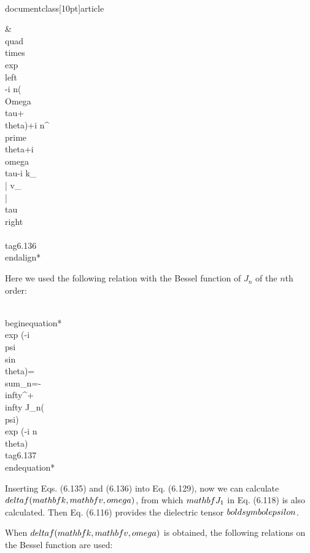 \\documentclass[10pt]{article}
\begin{document}
{{{{& \\quad \\times \\exp \\left\\{-i n(\\Omega \\tau+\\theta)+i n^{\\prime} \\theta+i \\omega \\tau-i k_{\\|} v_{\\|} \\tau\\right\\} \\tag{6.136}
\\end{align*}


Here we used the following relation with the Bessel function of $J_{n}$ of the $n$th order:


\\begin{equation*}
\\exp (-i \\psi \\sin \\theta)=\\sum_{n=-\\infty}^{+\\infty} J_{n}(\\psi) \\exp (-i n \\theta) \\tag{6.137}
\\end{equation*}


Inserting Eqs. (6.135) and (6.136) into Eq. (6.129), now we can calculate $\\delta f(\\mathbf{k}, \\mathbf{v}, \\omega)$, from which $\\mathbf{J}_{1}$ in Eq. (6.118) is also calculated. Then Eq. (6.116) provides the dielectric tensor $\\boldsymbol{\\epsilon}$.

When $\\delta f(\\mathbf{k}, \\mathbf{v}, \\omega)$ is obtained, the following relations on the Bessel function are used:

}}}}
\end{document}
